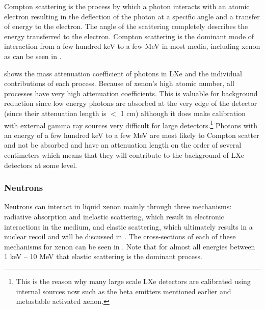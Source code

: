 Compton scattering is the process by which a photon interacts with an atomic electron resulting in the deflection of the photon at a specific angle and a transfer of energy to the electron.  The angle of the scattering completely describes the energy transferred to the electron.  Compton scattering is the dominant mode of interaction from a few hundred keV to a few MeV in most media, including xenon as can be seen in .

 shows the mass attenuation coefficient of photons in LXe and the individual contributions of each process.  Because of xenon's high atomic number, all processes have very high attenuation coefficients.  This is valuable for background reduction since low energy photons are absorbed at the very edge of the detector (since their attenuation length is $<$ 1 cm) although it does make calibration with external gamma ray sources very difficult for large detectors.\footnote{This is the reason why many large scale LXe detectors are calibrated using internal sources now such as the beta emitters mentioned earlier and metastable activated xenon.}  Photons with an energy of a few hundred keV to a few MeV are most likely to Compton scatter and not be absorbed and have an attenuation length on the order of several centimeters which means that they will contribute to the background of LXe detectors at some level.
 

\subsubsection{Neutrons}

Neutrons can interact in liquid xenon mainly through three mechanisms: radiative absorption and inelastic scattering, which result in electronic interactions in the medium, and elastic scattering, which ultimately results in a nuclear recoil and will be discussed in .   The cross-sections of each of these mechanisms for xenon can be seen in .  Note that for almost all energies between 1 keV -- 10 MeV that elastic scattering is the dominant process.


